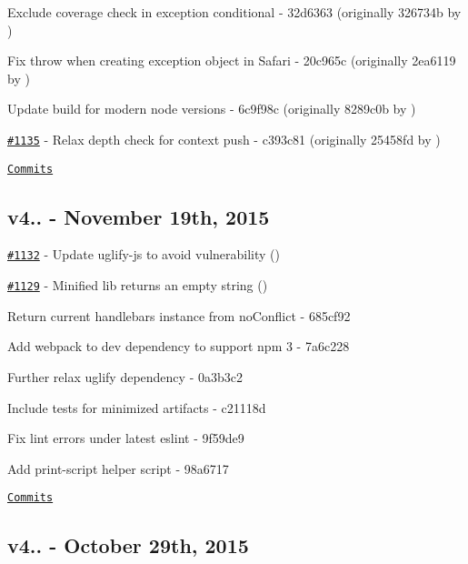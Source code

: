 \begin{DoxyItemize}
\item Exclude coverage check in exception conditional -\/ 32d6363 (originally 326734b by \href{https://github.com/kpdecker}{\tt })
\item Fix throw when creating exception object in Safari -\/ 20c965c (originally 2ea6119 by \href{https://github.com/kpdecker}{\tt })
\item Update build for modern node versions -\/ 6c9f98c (originally 8289c0b by \href{https://github.com/kpdecker}{\tt })
\item \href{https://github.com/wycats/handlebars.js/issues/1135}{\tt \#1135} -\/ Relax depth check for context push -\/ c393c81 (originally 25458fd by \href{https://github.com/kpdecker}{\tt })
\end{DoxyItemize}

\href{https://github.com/wycats/handlebars.js/compare/v4.0.5...v4.0.6}{\tt Commits}

\subsection*{v4.. -\/ November 19th, 2015}


\begin{DoxyItemize}
\item \href{https://github.com/wycats/handlebars.js/pull/1132}{\tt \#1132} -\/ Update uglify-\/js to avoid vulnerability (\href{https://api.github.com/users/plynchnlm}{\tt })
\item \href{https://github.com/wycats/handlebars.js/issues/1129}{\tt \#1129} -\/ Minified lib returns an empty string (\href{https://api.github.com/users/bricss}{\tt })
\item Return current handlebars instance from no\+Conflict -\/ 685cf92
\item Add webpack to dev dependency to support npm 3 -\/ 7a6c228
\item Further relax uglify dependency -\/ 0a3b3c2
\item Include tests for minimized artifacts -\/ c21118d
\item Fix lint errors under latest eslint -\/ 9f59de9
\item Add print-\/script helper script -\/ 98a6717
\end{DoxyItemize}

\href{https://github.com/wycats/handlebars.js/compare/v4.0.4...v4.0.5}{\tt Commits}

\subsection*{v4.. -\/ October 29th, 2015}



